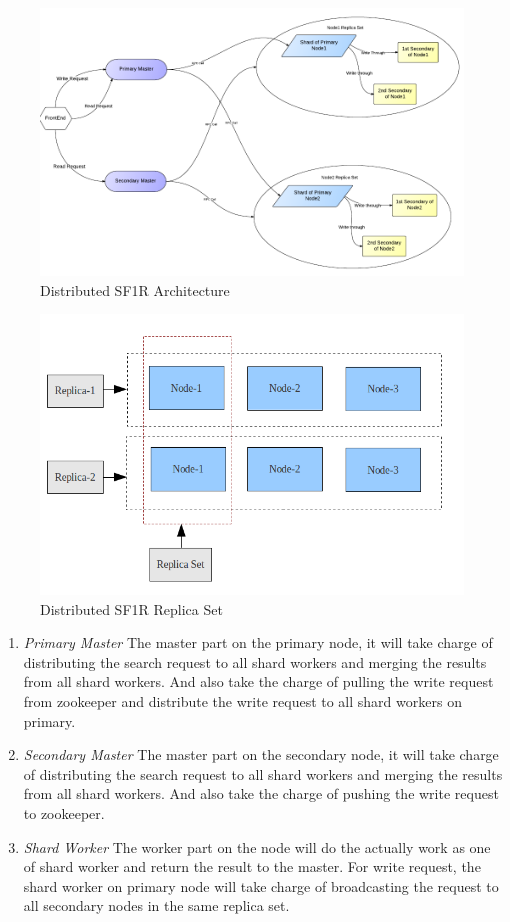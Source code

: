 \begin{figure}[!ht]\centering
  \includegraphics[width=.90\textwidth]{Figures/overview.png}
  \caption{Distributed SF1R Architecture}\label{fig:overview}
\end{figure}
\begin{figure}[!ht]\centering
  \includegraphics[width=.70\textwidth]{Figures/replica-set.png}
  \caption{Distributed SF1R Replica Set}\label{fig:replica-set}
\end{figure}

\begin{enumerate}
 \item \emph{Primary Master} \newline
   The master part on the primary node, it will take charge of distributing the search request to all shard workers and merging the results from all shard workers. And also take the charge of pulling the write request from zookeeper and distribute the write request to all shard workers on primary.

 \item \emph{Secondary Master} \newline
   The master part on the secondary node, it will take charge of distributing the search request to all shard workers and merging the results from all shard workers. And also take the charge of pushing the write request to zookeeper.
 \item \emph{Shard Worker} \newline
    The worker part on the node will do the actually work as one of shard worker and return the result to the master. For write request, the shard worker on primary node will take charge of broadcasting the request to all secondary nodes in the same replica set.
\end{enumerate}

